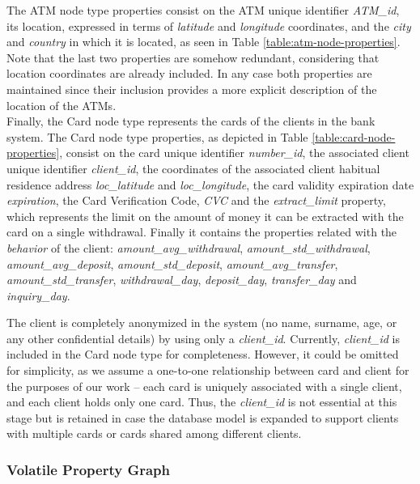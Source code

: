 The ATM node type properties consist on the ATM unique identifier \emph{ATM\_id}, its location, expressed in terms of \emph{latitude} and \emph{longitude} coordinates, and the \emph{city} and 
\emph{country} in which it is located, as seen in Table \ref{table:atm-node-properties}.
Note that the last two properties are somehow redundant, considering that location coordinates
are already included. In any case both properties are maintained since their inclusion provides a more explicit description of the location of the ATMs.\\

Finally, the Card node type represents the cards of the clients in the bank system. The Card node type properties, as depicted in Table
\ref{table:card-node-properties}, consist on the card unique 
identifier \emph{number\_id}, the associated client unique identifier \emph{client\_id}, the coordinates of the associated client habitual residence address \emph{loc\_latitude} and 
\emph{loc\_longitude}, the card validity expiration date \emph{expiration}, the Card Verification Code, \emph{CVC} and the \emph{extract\_limit} property, which represents the limit on the amount of money it can be extracted with the card on a single withdrawal. Finally it contains the properties related with the \emph{behavior} of the client: \emph{amount\_avg\_withdrawal}, \emph{amount\_std\_withdrawal}, \emph{amount\_avg\_deposit}, 
\emph{amount\_std\_deposit}, \emph{amount\_avg\_transfer},  \emph{amount\_std\_transfer}, \emph{withdrawal\_day}, \emph{deposit\_day}, \emph{transfer\_day} and \emph{inquiry\_day}.



The client is completely anonymized in the system (no name, surname, age, or any other confidential details) by using only a \emph{client\_id}. Currently, \emph{client\_id} is included in the Card node type for completeness. However, it could be omitted for simplicity, as we assume a one-to-one relationship between card and client for the purposes of our work -- each card is uniquely associated with a single client, and each client holds only one card. Thus, the \emph{client\_id} is not essential at this stage but is retained in case the database model is expanded to support clients with multiple cards or cards shared among different clients.

\subsubsection{Volatile Property Graph}\label{section:volatile-pg}

